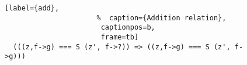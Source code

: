 \begin{figure}[!t]
  \centering
  \begin{minipage}{\columnwidth}
    \begin{lstlisting}[label={add},
                      %  caption={Addition relation},
                       captionpos=b,
                       frame=tb]
  (((z,f->g) === S (z', f->?)) => ((z,f->g) === S (z', f->g)))
    \end{lstlisting}
  \end{minipage}
\end{figure}